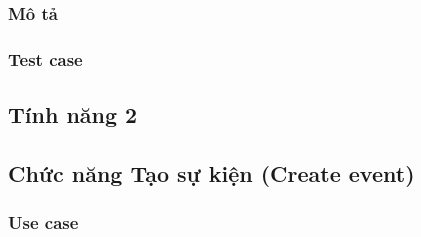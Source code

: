 \documentclass[a4paper, 12pt]{article}
\begin{document}
\subsubsection{Mô tả}
\subsubsection{Test case}
\subsection{Tính năng 2}

\subsection{Chức năng Tạo sự kiện (Create event)}
\subsubsection{Use case}
\end{document}
